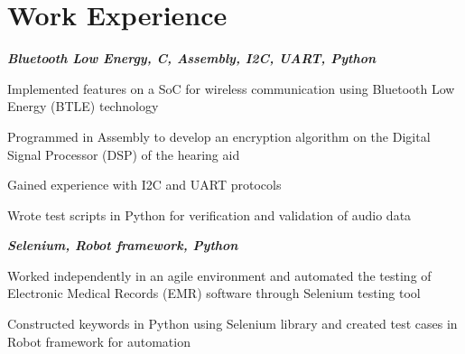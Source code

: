 \documentclass[letterpaper, 10pt]{deedy-resume} %
\begin{document}
\begin{minipage}[t]{0.65\textwidth} %

\section{Work Experience}

\textit{\bf{Bluetooth Low Energy, C, Assembly, I2C, UART, Python}}
\vspace{\topsep} %
\begin{tightitemize}
\item Implemented features on a SoC for wireless communication using Bluetooth Low Energy (BTLE) technology
\item Programmed in Assembly to develop an encryption algorithm on the Digital Signal Processor (DSP) of the hearing aid
\item Gained experience with I2C and UART protocols
\item Wrote test scripts in Python for verification and validation of audio data
\end{tightitemize}
\sectionspace 

\textit{\bf{Selenium, Robot framework, Python}}
\vspace{\topsep} %
\begin{tightitemize}
\item Worked independently in an agile environment and automated the testing of Electronic Medical Records (EMR) software through Selenium testing tool
\item Constructed keywords in Python using Selenium library and created test cases in Robot framework for automation
\end{tightitemize}
\sectionspace


\end{minipage}
\end{document}
